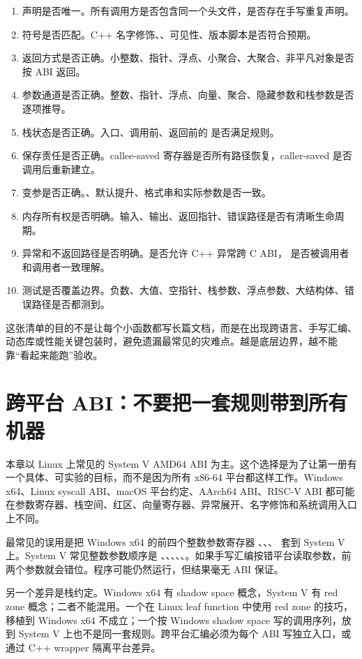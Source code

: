 \begin{enumerate}
  \item 声明是否唯一。所有调用方是否包含同一个头文件，是否存在手写重复声明。
  \item 符号是否匹配。C++ 名字修饰、、可见性、版本脚本是否符合预期。
  \item 返回方式是否正确。小整数、指针、浮点、小聚合、大聚合、非平凡对象是否按 ABI 返回。
  \item 参数通道是否正确。整数、指针、浮点、向量、聚合、隐藏参数和栈参数是否逐项推导。
  \item 栈状态是否正确。入口、调用前、返回前的  是否满足规则。
  \item 保存责任是否正确。callee-saved 寄存器是否所有路径恢复，caller-saved 是否调用后重新建立。
  \item 变参是否正确。、默认提升、格式串和实际参数是否一致。
  \item 内存所有权是否明确。输入、输出、返回指针、错误路径是否有清晰生命周期。
  \item 异常和不返回路径是否明确。是否允许 C++ 异常跨 C ABI，\code{[[noreturn]]} 是否被调用者和调用者一致理解。
  \item 测试是否覆盖边界。负数、大值、空指针、栈参数、浮点参数、大结构体、错误路径是否都测到。
\end{enumerate}

这张清单的目的不是让每个小函数都写长篇文档，而是在出现跨语言、手写汇编、动态库或性能关键包装时，避免遗漏最常见的灾难点。越是底层边界，越不能靠“看起来能跑”验收。

\section{跨平台 ABI：不要把一套规则带到所有机器}

本章以 Linux 上常见的 System V AMD64 ABI 为主。这个选择是为了让第一册有一个具体、可实验的目标，而不是因为所有 x86-64 平台都这样工作。Windows x64、Linux syscall ABI、macOS 平台约定、AArch64 ABI、RISC-V ABI 都可能在参数寄存器、栈空间、红区、向量寄存器、异常展开、名字修饰和系统调用入口上不同。

最常见的误用是把 Windows x64 的前四个整数参数寄存器 、、、 套到 System V 上。System V 常见整数参数顺序是 、、、、、。如果手写汇编按错平台读取参数，前两个参数就会错位。程序可能仍然运行，但结果毫无 ABI 保证。

另一个差异是栈约定。Windows x64 有 shadow space 概念，System V 有 red zone 概念；二者不能混用。一个在 Linux leaf function 中使用 red zone 的技巧，移植到 Windows x64 不成立；一个按 Windows shadow space 写的调用序列，放到 System V 上也不是同一套规则。跨平台汇编必须为每个 ABI 写独立入口，或通过 C++ wrapper 隔离平台差异。

